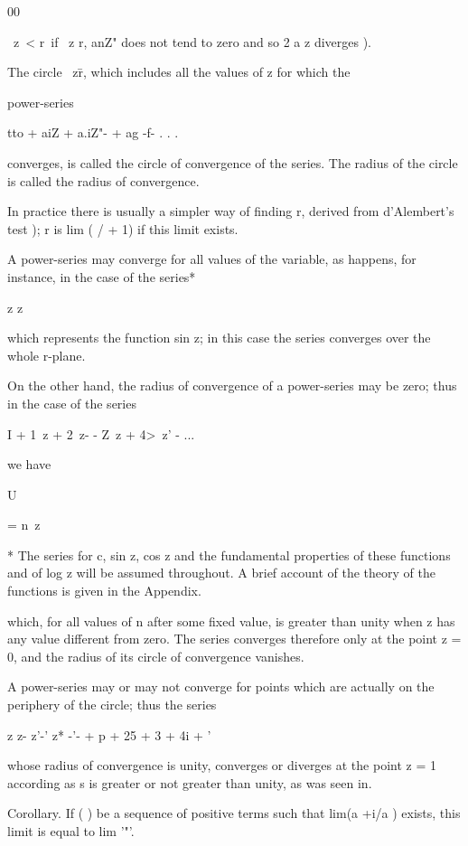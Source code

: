 00

\ z\ < r\ if \ z r, anZ" does not tend to zero and so 2 a z diverges
).

The circle \ z\=r, which includes all the values of z for which the

power-series

tto + aiZ + a.iZ"- + ag -f- . . .

converges, is called the circle of convergence of the series. The
radius of the circle is called the radius of convergence.

In practice there is usually a simpler way of finding r, derived from
d'Alembert's test ); r is lim ( / + 1) if this limit exists.

A power-series may converge for all values of the variable, as
happens, for instance, in the case of the series*

z z

which represents the function sin z; in this case the series
converges over the whole r-plane.

On the other hand, the radius of convergence of a power-series may be
zero; thus in the case of the series

I + 1\ z + 2\ z- - Z\ z + 4>\ z' - ...

we have

U

= n\ z

* The series for c, sin z, cos z and the fundamental properties of
these functions and of log z will be assumed throughout. A brief
account of the theory of the functions is given in the Appendix.

%
%

which, for all values of n after some fixed value, is greater than
unity when z has any value different from zero. The series converges
therefore only at the point z = 0, and the radius of its circle of
convergence vanishes.

A power-series may or may not converge for points which are actually
on the periphery of the circle; thus the series

z z- z'-' z* -'- + p + 25 + 3 + 4i +   '

whose radius of convergence is unity, converges or diverges at the
point z = 1 according as s is greater or not greater than unity, as
was seen in.

Corollary. If ( ) be a sequence of positive terms such that lim(a +i/a
) exists, this limit is equal to lim '"'.

